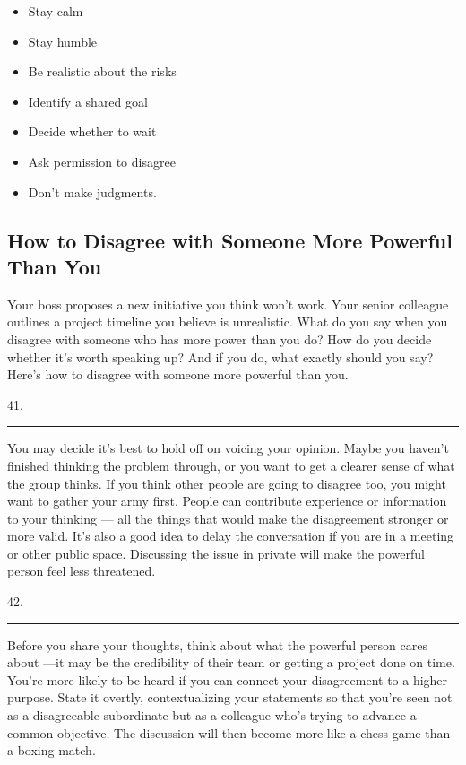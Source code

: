 \documentclass[UTF8,11pt]{ctexart}
\begin{document}
\begin{itemize}[leftmargin=2em,itemsep=.2em,topsep=.4em]\item[A.] Stay calm
\item[B.] Stay humble
\item[C.] Be realistic about the risks
\item[D.] Identify a shared goal
\item[E.] Decide whether to wait
\item[F.] Ask permission to disagree
\item[G.] Don’t make judgments.
\end{itemize}

\subsection*{\textbf{How to Disagree with Someone More Powerful Than You}}


Your boss proposes a new initiative you think won’t work. Your senior colleague outlines a project timeline you believe is unrealistic. What do you say when you disagree with someone who has more power than you do? How do you decide whether it’s worth speaking up? And if you do, what exactly should you say? Here’s how to disagree with someone more powerful than you.


41. \par\noindent\rule{.95\linewidth}{.4pt}\par


You may decide it’s best to hold off on voicing your opinion. Maybe you haven’t finished thinking the problem through, or you want to get a clearer sense of what the group thinks. If you think other people are going to disagree too, you might want to gather your army first. People can contribute experience or information to your thinking — all the things that would make the disagreement stronger or more valid. It’s also a good idea to delay the conversation if you are in a meeting or other public space. Discussing the issue in private will make the powerful person feel less threatened.


42. \par\noindent\rule{.95\linewidth}{.4pt}\par


Before you share your thoughts, think about what the powerful person cares about —it may be the credibility of their team or getting a project done on time. You’re more likely to be heard if you can connect your disagreement to a higher purpose. State it overtly, contextualizing your statements so that you’re seen not as a disagreeable subordinate but as a colleague who’s trying to advance a common objective. The discussion will then become more like a chess game than a boxing match.
\end{document}
